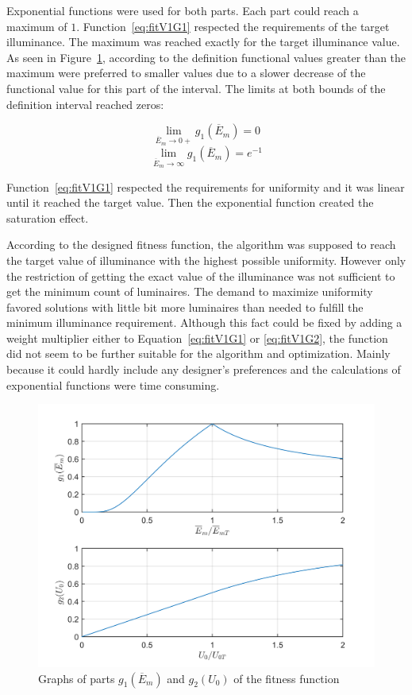 Exponential functions were used for both parts. Each part could reach a maximum of $1$. Function~\ref{eq:fitV1G1} respected the requirements of the target illuminance. The maximum was reached exactly for the target illuminance value. As seen in Figure~\ref{fig:fitV1G1G2}, according to the definition functional values greater than the maximum were preferred to smaller values due to a slower decrease of the functional value for this part of the interval. The limits at both bounds of the definition interval reached zeros:

\begin{equation}
\label{eq:g1lim0}
\lim_{\overline{E}_{m}\to 0+} g_1\left(\overline{E}_{m}\right) = 0
\end{equation}
\begin{equation}
\label{eq:g1limInf}
\lim_{\overline{E}_{m}\to \infty} g_1\left(\overline{E}_{m}\right) = e^{-1}
\end{equation}

Function~\ref{eq:fitV1G1} respected the requirements for uniformity and it was linear until it reached the target value. Then the exponential function created the saturation effect.

According to the designed fitness function, the algorithm was supposed to reach the target value of illuminance with the highest possible uniformity. However only the restriction of getting the exact value of the illuminance was not sufficient to get the minimum count of luminaires. The demand to maximize uniformity favored solutions with little bit more luminaires than needed to fulfill the minimum illuminance requirement. Although this fact could be fixed by adding a weight multiplier either to Equation~\ref{eq:fitV1G1} or \ref{eq:fitV1G2}, the function did not seem to be further suitable for the algorithm and optimization. Mainly because it could hardly include any designer's preferences and the calculations of exponential functions were time consuming.

\begin{figure}[htb]
  \centering
  \includegraphics[width=\columnwidth]{obrG1G2}
  \caption{Graphs of parts $g_1\left(\overline{E}_{m}\right)$ and $g_2\left(U_0\right)$ of the fitness function}
  \label{fig:fitV1G1G2}
\end{figure}

